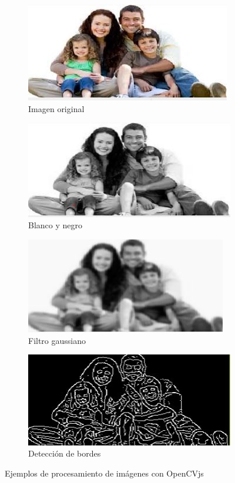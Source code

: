 \documentclass{report}
\begin{document}
\begin{figure}[h]
\begin{subfigure}{.5\textwidth}
  \centering
  \includegraphics[width=.7\linewidth]{images/imagen.JPG}  
  \caption{Imagen original}
  \label{fig:sub-first}
\end{subfigure}
\begin{subfigure}{.5\textwidth}
  \centering
  \includegraphics[width=.7\linewidth]{images/gris.JPG}  
  \caption{Blanco y negro}
  \label{fig:sub-second}
\end{subfigure}


\begin{subfigure}{.5\textwidth}
  \centering
  \includegraphics[width=.7\linewidth]{images/blur.JPG}  
  \caption{Filtro gaussiano}
  \label{fig:sub-third}
\end{subfigure}
\begin{subfigure}{.5\textwidth}
  \centering
  \includegraphics[width=.7\linewidth]{images/bordes.JPG}  
  \caption{Detección de bordes}
  \label{fig:sub-fourth}
\end{subfigure}
\caption{Ejemplos de procesamiento de imágenes con OpenCVjs}
\label{fig:fig}
\end{figure}
\end{document}
